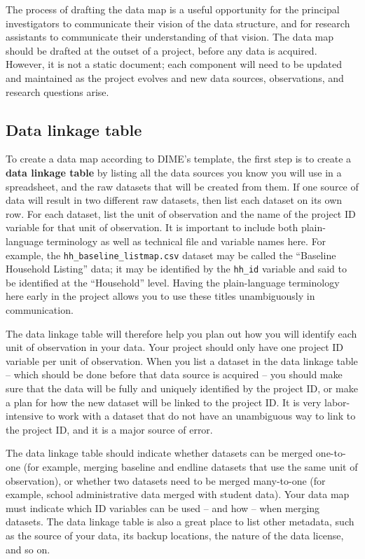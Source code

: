 The process of drafting the data map is a useful
opportunity for the principal investigators
to communicate their vision of the data structure,
and for research assistants to communicate
their understanding of that vision.
The data map should be drafted at the outset of a project,
before any data is acquired.
However, it is not a static document;
each component will need to be updated
and maintained as the project evolves
and new data sources, observations, and research questions arise.

\subsection{Data linkage table}

To create a data map according to DIME's template,
the first step is to create a \textbf{data linkage table} by listing
all the data sources you know you will use in a spreadsheet,
and the raw datasets that will be created from them.
If one source of data will result in two different raw datasets,
then list each dataset on its own row.
For each dataset, list the unit of observation
and the name of the project ID variable for that unit of observation.
It is important to include both plain-language terminology
as well as technical file and variable names here.
For example, the \texttt{hh\_baseline\_listmap.csv} dataset
may be called the ``Baseline Household Listing'' data;
it may be identified by the \texttt{hh\_id} variable
and said to be identified at the ``Household'' level.
Having the plain-language terminology here early in the project
allows you to use these titles unambiguously in communication.

The data linkage table will therefore help you plan out
how you will identify each unit of observation in your data.
Your project should only have one project ID variable per unit of observation.
When you list a dataset in the data linkage table --
which should be done before that data source is acquired --
you should make sure that the data will
be fully and uniquely identified by the project ID,
or make a plan for how the new dataset will be linked to the project ID.
It is very labor-intensive to work with a dataset that
do not have an unambiguous way to link to the project ID,
and it is a major source of error.

The data linkage table should indicate whether
datasets can be merged one-to-one (for example,
merging baseline and endline datasets
that use the same unit of observation),
or whether two datasets need to be merged many-to-one
(for example, school administrative data merged with student data).
Your data map must indicate which ID variables
can be used -- and how -- when merging datasets.
The data linkage table is also a great place to list other metadata,
such as the source of your data, its backup locations,
the nature of the data license, and so on.

